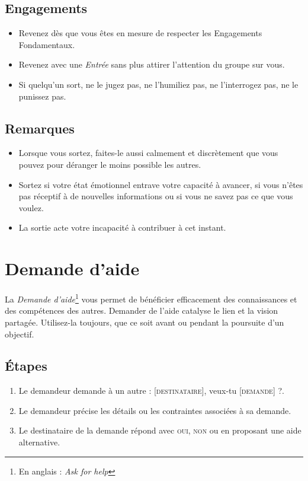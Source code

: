 \documentclass[paper=6in:9in,pagesize=pdftex,headinclude=on,footinclude=on,12pt]{scrbook}
\begin{document}
\subsection{Engagements}
\begin{itemize}
	\item Revenez dès que vous êtes en mesure de respecter les Engagements Fondamentaux.
	\item Revenez avec une \emph{Entrée} sans plus attirer l'attention du groupe sur vous.
	\item Si quelqu'un sort, ne le jugez pas, ne l'humiliez pas, ne l'interrogez pas, ne le punissez pas.
\end{itemize}

\subsection{Remarques}
\begin{itemize}
	\item Lorsque vous sortez, faites-le aussi calmement et discrètement que vous pouvez pour déranger le moins possible les autres.
	\item Sortez si votre état émotionnel entrave votre capacité à avancer, si vous n'êtes pas réceptif à de nouvelles informations ou
	      si vous ne savez pas ce que vous voulez.
	\item La sortie acte votre incapacité à contribuer à cet instant.
\end{itemize}

\section{Demande d'aide} \label{demande-aide}

La \emph{Demande d'aide}\footnote{En anglais : \emph{Ask for help}} vous permet de bénéficier efficacement des connaissances et des compétences des autres. Demander de l'aide
catalyse le lien et la vision partagée. Utilisez-la toujours, que ce soit avant ou pendant la poursuite d'un objectif.

\subsection{Étapes}
\begin{enumerate}
	\item Le demandeur demande à un autre : \og{}[\textsc{destinataire}], veux-tu [\textsc{demande}] ?\fg{}.
	\item Le demandeur précise les détails ou les contraintes associées à sa demande.
	\item Le destinataire de la demande répond avec \textsc{oui}, \textsc{non} ou en proposant une aide alternative.
\end{enumerate}
\end{document}
